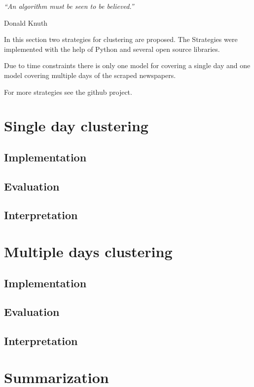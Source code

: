 \epigraph{\emph{
  ``An algorithm must be seen to be believed.''
}}{ Donald Knuth }

In this section two strategies for clustering are proposed. The Strategies were implemented with the help of Python and several open source libraries. 

Due to time constraints there is only one model for covering a single day and one model covering multiple days of the scraped newspapers. 

For more strategies see the github project.

\section{Single day clustering}
  \subsection{Implementation}
  \subsection{Evaluation}
  \subsection{Interpretation}

\section{Multiple days clustering}
  \subsection{Implementation}
  \subsection{Evaluation}
  \subsection{Interpretation}

\section{Summarization}